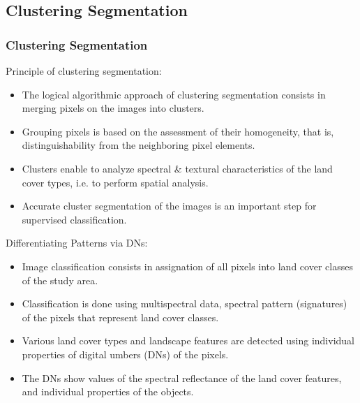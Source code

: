 \documentclass[pdflatex,compress,8pt,
	xcolor={dvipsnames,dvipsnames,svgnames,x11names,table},
	hyperref={
	breaklinks = true, 
	pdfauthor={Lemenkova Polina}, 
	pdfsubject={Preentation}, 
	pdfcreator={Lemenkova Polina}, 
	pdfproducer={Lemenkova Polina}, 
	citecolor=NavyBlue, 
	urlbordercolor=cyan,
	urlcolor = NavyBlue, 
	breaklinks = true}]{beamer}
\begin{document}
\subsection{Clustering Segmentation}
\begin{frame}\frametitle{Clustering Segmentation}
Principle of clustering segmentation:
\begin{itemize}
	\item The logical algorithmic approach of clustering segmentation consists in merging pixels on the images into clusters.
	\item Grouping pixels is based on the assessment of their homogeneity, that is, distinguishability from the neighboring pixel elements.
	\item Clusters enable to analyze spectral \& textural characteristics of the land cover types, i.e. to perform spatial analysis.
	\item Accurate cluster segmentation of the images is an important step for supervised classification.
\end{itemize}
Differentiating Patterns via DNs:
\begin{itemize}
	\item Image classification consists in assignation of all pixels into land cover classes of the study area.
	\item Classification is done using multispectral data, spectral pattern (signatures) of the pixels that represent land cover classes.
	\item Various land cover types and landscape features are detected using individual properties of digital umbers (DNs) of the pixels.
	\item The DNs show values of the spectral reflectance of the land cover features, and individual properties of the objects.
\end{itemize}
\end{frame}
\end{document}
